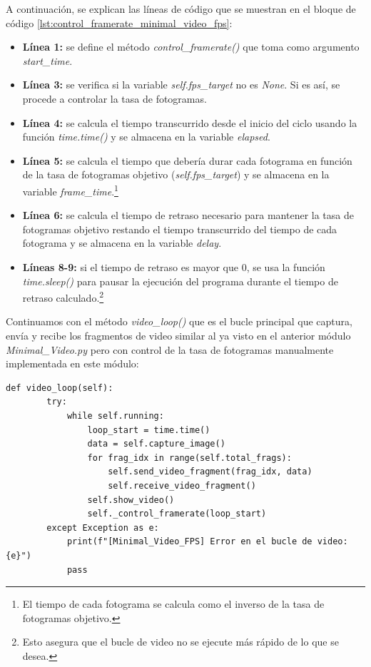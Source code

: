 A continuación, se explican las líneas de código que se muestran en el bloque de código \ref{lst:control_framerate_minimal_video_fps}:
\begin{itemize}
    \item \textbf{Línea 1:} se define el método \textit{control\_framerate()} que toma como argumento \textit{start\_time}.
    \item \textbf{Línea 3:} se verifica si la variable \textit{self.fps\_target} no es \textit{None}. Si es así, se procede a controlar la tasa de fotogramas.
    \item \textbf{Línea 4:} se calcula el tiempo transcurrido desde el inicio del ciclo usando la función \textit{time.time()} y se almacena en la variable \textit{elapsed}.
    \item \textbf{Línea 5:} se calcula el tiempo que debería durar cada fotograma en función de la tasa de fotogramas objetivo (\textit{self.fps\_target}) y se almacena en la variable \textit{frame\_time}.\footnote{El tiempo de cada fotograma se calcula como el inverso de la tasa de fotogramas objetivo.}
    \item \textbf{Línea 6:} se calcula el tiempo de retraso necesario para mantener la tasa de fotogramas objetivo restando el tiempo transcurrido del tiempo de cada fotograma y se almacena en la variable \textit{delay}.
    \item \textbf{Líneas 8-9:} si el tiempo de retraso es mayor que 0, se usa la función \textit{time.sleep()} para pausar la ejecución del programa durante el tiempo de retraso calculado.\footnote{Esto asegura que el bucle de video no se ejecute más rápido de lo que se desea.}
\end{itemize}
\vspace{\baselineskip}

Continuamos con el método \textit{video\_loop()} que es el bucle principal que captura, envía y recibe los fragmentos de video similar al ya visto en el anterior módulo \textit{Minimal\_Video.py} pero con control de la tasa de fotogramas manualmente implementada en este módulo:
\begin{lstlisting}[style=pythonstyle, caption={Método video\_loop() de \textit{Minimal\_Video\_FPS}}, label={lst:video_loop_minimal_video_fps}]
def video_loop(self):
        try:
            while self.running:
                loop_start = time.time()
                data = self.capture_image()
                for frag_idx in range(self.total_frags):
                    self.send_video_fragment(frag_idx, data)
                    self.receive_video_fragment()
                self.show_video()
                self._control_framerate(loop_start)
        except Exception as e:
            print(f"[Minimal_Video_FPS] Error en el bucle de video: {e}")
            pass
\end{lstlisting}
\vspace{\baselineskip}

